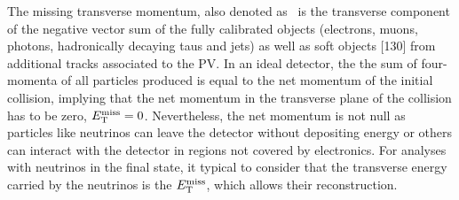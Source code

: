 The missing transverse momentum, also denoted as \MET\ is the transverse component of the negative vector sum of the fully calibrated objects (electrons, muons, photons, hadronically decaying taus and jets) as well
as soft objects [130] from additional tracks associated to the PV. In an ideal detector, the the sum of four-momenta of all particles produced is equal to the net momentum of the initial collision, implying that the net momentum in the transverse plane of the collision has to be zero, $E_{\text{T}}^{\text{miss}}=0$. Nevertheless, the net momentum is not null as particles like neutrinos can leave the detector without depositing energy or others can interact with the detector in regions not covered by electronics. For analyses with neutrinos in the final state, it typical to consider that the transverse energy carried by the neutrinos is the $E_{\text{T}}^{\text{miss}}$, which allows their reconstruction.